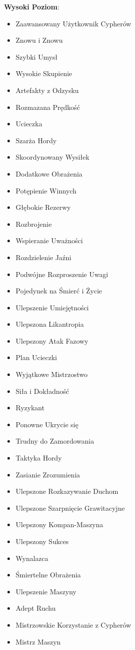 \textbf{Wysoki Poziom}:

\begin{itemize}
\item Zaawansowany Użytkownik Cypherów
\item Znowu i Znowu
\item Szybki Umysł
\item Wysokie Skupienie
\item Artefakty z Odzysku
\item Rozmazana Prędkość
\item Ucieczka
\item Szarża Hordy
\item Skoordynowany Wysiłek
\item Dodatkowe Obrażenia
\item Potępienie Winnych
\item Głębokie Rezerwy
\item Rozbrojenie
\item Wspieranie Uważności
\item Rozdzielenie Jaźni
\item Podwójne Rozproszenie Uwagi
\item Pojedynek na Śmierć i Życie
\item Ulepszenie Umiejętności
\item Ulepszona Likantropia
\item Ulepszony Atak Fazowy
\item Plan Ucieczki
\item Wyjątkowe Mistrzostwo
\item Siła i Dokładność
\item Ryzykant
\item Ponowne Ukrycie się
\item Trudny do Zamordowania
\item Taktyka Hordy
\item Zasianie Zrozumienia
\item Ulepszone Rozkazywanie Duchom
\item Ulepszone Szarpnięcie Grawitacyjne
\item Ulepszony Kompan-Maszyna
\item Ulepszony Sukces
\item Wynalazca
\item Śmiertelne Obrażenia
\item Ulepszenie Maszyny
\item Adept Ruchu
\item Mistrzowskie Korzystanie z Cypherów
\item Mistrz Maszyn

\end{itemize}
